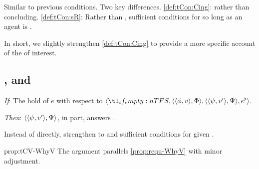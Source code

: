\begin{note}
  \noindent%
  Similar to previous conditions.
  Two key differences.
  \ref{def:tCon:Cing}: \tCV{} rather than concluding.
  \ref{def:tCon:sR}: Rather than \requ{}, sufficient conditions for \requ{} so long as an agent is \tCV{}.

  In short, we slightly strengthen \ref{def:tCon:Cing} to provide a more specific account of the  of interest.
\end{note}

\subsection{, \qWhyV{} and \issueConstraint{}}
\label{sec:tccon2-qwhyv-}

\begin{note}
  \begin{proposition}
    \label{prop:tCV-WhyV}
    \vspace{-\baselineskip}
    \begin{itenum}
    \item[\emph{If}:]
      The  hold of \(e\) with respect to \(\langle \vAgent{}, \pvp{\phi}{v}{\Phi}, \pvp{\psi}{v'}{\Psi}, e^{\flat} \rangle\).
    \item[\emph{Then}:]
      \(\langle \langle \psi, v' \rangle, \Psi \rangle\), in part, answers \qWhyV{}.
    \end{itenum}
    \vspace{-1.5\baselineskip}
  \end{proposition}

  Instead of \requ{} directly, strengthen to \tCV{} and sufficient conditions for \requ{} given \tCV{}.

  \begin{argument}{prop:tCV-WhyV}
    The argument parallels \autoref{prop:requ-WhyV} with  minor adjustment.


\end{argument}
\end{note}
